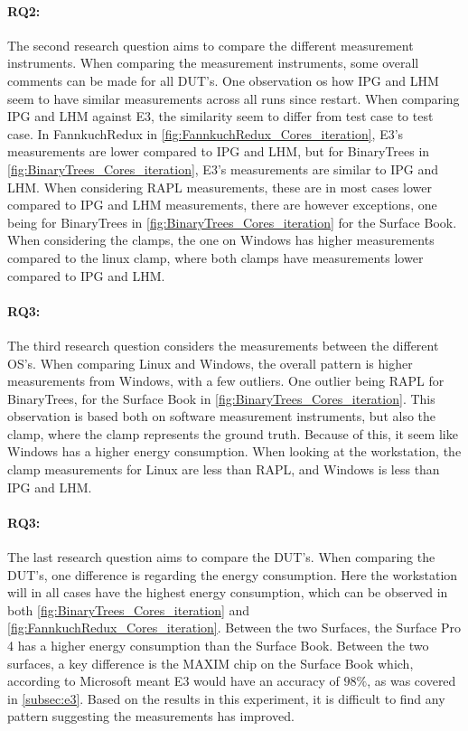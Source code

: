 \paragraph*{RQ2:} The second research question aims to compare the different measurement instruments. When comparing the measurement instruments, some overall comments can be made for all DUT's. One observation os how IPG and LHM seem to have similar measurements across all runs since restart. When comparing IPG and LHM against E3, the similarity seem to differ from test case to test case. In FannkuchRedux in \cref{fig:FannkuchRedux_Cores_iteration}, E3's measurements are lower compared to IPG and LHM, but for BinaryTrees in \cref{fig:BinaryTrees_Cores_iteration}, E3's measurements are similar to IPG and LHM. When considering RAPL measurements, these are in most cases lower compared to IPG and LHM measurements, there are however exceptions, one being for BinaryTrees in \cref*{fig:BinaryTrees_Cores_iteration} for the Surface Book. When considering the clamps, the one on Windows has higher measurements compared to the linux clamp, where both clamps have measurements lower compared to IPG and LHM. 



\paragraph*{RQ3:} The third research question considers the measurements between the different OS's. When comparing Linux and Windows, the overall pattern is higher measurements from Windows, with a few outliers. One outlier being RAPL for BinaryTrees, for the Surface Book in \cref{fig:BinaryTrees_Cores_iteration}. This observation is based both on software measurement instruments, but also the clamp, where the clamp represents the ground truth. Because of this, it seem like Windows has a higher energy consumption. When looking at the workstation, the clamp measurements for Linux are less than RAPL, and Windows is less than IPG and LHM.

\paragraph*{RQ3:} The last research question aims to compare the DUT's. When comparing the DUT's, one difference is regarding the energy consumption. Here the workstation will in all cases have the highest energy consumption, which can be observed in both \cref*{fig:BinaryTrees_Cores_iteration} and \cref*{fig:FannkuchRedux_Cores_iteration}. Between the two Surfaces, the Surface Pro 4 has a higher energy consumption than the Surface Book. Between the two surfaces, a key difference is the MAXIM chip on the Surface Book which, according to Microsoft meant E3 would have an accuracy of $98\%$, as was covered in \cref*{subsec:e3}. Based on the results in this experiment, it is difficult to find any pattern suggesting the measurements has improved.
